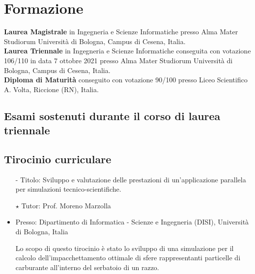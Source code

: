 \documentclass[curriculum-vitae-ita]{subfiles}
\begin{document}
	\section*{Formazione}
		 \textbf{Laurea Magistrale} in Ingegneria e Scienze Informatiche presso Alma Mater Studiorum Università di Bologna, Campus di Cesena, Italia.\\
		
		 \textbf{Laurea Triennale} in Ingegneria e Scienze Informatiche conseguita con votazione 106/110 in data 7 ottobre 2021 presso Alma Mater Studiorum Università di Bologna, Campus di Cesena, Italia.\\

		 \textbf{Diploma di Maturità} conseguito con votazione 90/100 presso Liceo Scientifico A. Volta, Riccione (RN), Italia.
		
		\subsection*{Esami sostenuti durante il corso di laurea triennale}
			\begin{minipage}[t]{.47\textwidth}
			\end{minipage}
			\hfill
			\begin{minipage}[t]{.47\textwidth}
			\end{minipage}
		
		\subsection*{Tirocinio curriculare}
			\begin{itemize}
				\item[-] {\large Titolo:} Sviluppo e valutazione delle prestazioni di un'applicazione parallela per simulazioni tecnico-scientifiche.
				\item[$\star$] {\large Tutor:} Prof. Moreno Marzolla
				\item {\large Presso:} Dipartimento di Informatica - Scienze e Ingegneria (DISI), Università di Bologna, Italia
				\item[] Lo scopo di questo tirocinio è stato lo sviluppo di una simulazione per il calcolo dell'impacchettamento ottimale di sfere rappresentanti particelle di carburante all'interno del serbatoio di un razzo.
			\end{itemize}
		
\end{document}
